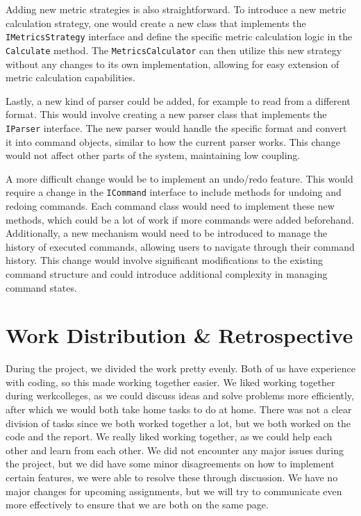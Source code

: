 \documentclass[11pt,a4paper]{article}
\begin{document}
Adding new metric strategies is also straightforward. To introduce a new metric calculation strategy, one would create a new class that implements the \texttt{IMetricsStrategy} interface and define the specific metric calculation logic in the \texttt{Calculate} method. The \texttt{MetricsCalculator} can then utilize this new strategy without any changes to its own implementation, allowing for easy extension of metric calculation capabilities.

Lastly, a new kind of parser could be added, for example to read from a different format. This would involve creating a new parser class that implements the \texttt{IParser} interface. The new parser would handle the specific format and convert it into command objects, similar to how the current parser works. This change would not affect other parts of the system, maintaining low coupling.

A more difficult change would be to implement an undo/redo feature. This would require a change in the \texttt{ICommand} interface to include methods for undoing and redoing commands. Each command class would need to implement these new methods, which could be a lot of work if more commands were added beforehand. Additionally, a new mechanism would need to be introduced to manage the history of executed commands, allowing users to navigate through their command history. This change would involve significant modifications to the existing command structure and could introduce additional complexity in managing command states.

\section*{Work Distribution \& Retrospective}

During the project, we divided the work pretty evenly. Both of us have experience with coding, so this made working together easier. 
We liked working together during werkcolleges, as we could discuss ideas and solve problems more efficiently, after which we would both take home tasks to do at home. 
There was not a clear division of tasks since we both worked together a lot, but we both worked on the code and the report. 
We really liked working together, as we could help each other and learn from each other. 
We did not encounter any major issues during the project, but we did have some minor disagreements on how to implement certain features, we were able to resolve these through discussion. 
We have no major changes for upcoming assignments, but we will try to communicate even more effectively to ensure that we are both on the same page.
\end{document}
